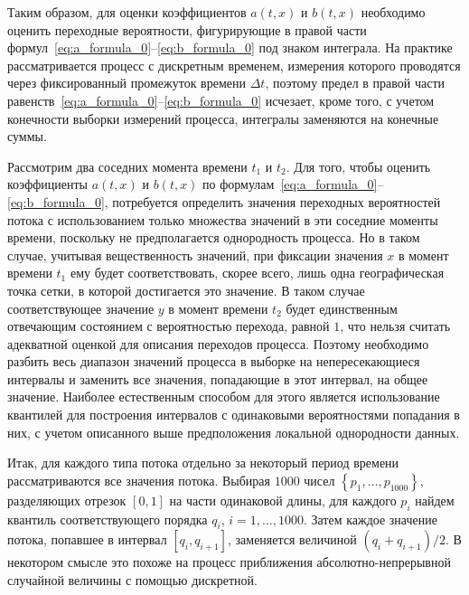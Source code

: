 Таким образом, для оценки коэффициентов $a(t,x)$ и $b(t,x)$ необходимо оценить переходные вероятности, фигурирующие в правой части формул~\eqref{eq:a_formula_0}--\eqref{eq:b_formula_0} под знаком интеграла. На практике рассматривается процесс с дискретным временем, измерения которого проводятся через фиксированный промежуток времени $\varDelta t$, поэтому предел в правой части равенств~\eqref{eq:a_formula_0}--\eqref{eq:b_formula_0} исчезает, кроме того, с учетом конечности выборки измерений процесса, интегралы заменяются на конечные суммы.

Рассмотрим два соседних момента времени $t_1$ и $t_2$. Для того, чтобы оценить коэффициенты $a(t,x)$ и $b(t,x)$ по формулам~\eqref{eq:a_formula_0}--\eqref{eq:b_formula_0}, потребуется определить значения переходных вероятностей потока с использованием только множества значений в эти соседние моменты времени, поскольку не предполагается однородность процесса. Но в таком случае, учитывая вещественность значений, при фиксации значения $x$ в момент времени $t_1$ ему будет соответствовать, скорее всего, лишь одна географическая точка сетки, в которой достигается это значение. В таком случае соответствующее значение $y$ в момент времени $t_2$ будет единственным отвечающим состоянием с вероятностью перехода, равной $1$, что нельзя считать адекватной оценкой для описания переходов процесса. Поэтому необходимо разбить весь диапазон значений процесса в выборке на непересекающиеся интервалы и заменить все значения, попадающие в этот интервал, на общее значение. Наиболее естественным способом для этого является использование квантилей для построения интервалов с одинаковыми вероятностями попадания в них, с учетом описанного выше предположения локальной однородности данных.

Итак, для каждого типа потока отдельно за некоторый период времени рассматриваются все значения потока. Выбирая $1000$ чисел $\left\lbrace p_1, \ldots, p_{1000} \right\rbrace $, разделяющих  отрезок $[0, 1]$ на части одинаковой длины, для каждого $p_i$ найдем квантиль соответствующего порядка $q_i$, $i=1, \ldots, 1000$. Затем каждое значение потока, попавшее в интервал $[q_i, q_{i+1}]$, заменяется величиной $(q_i + q_{i+1})/2$. В некотором смысле это похоже на процесс приближения абсолютно-непрерывной случайной величины с помощью дискретной.

